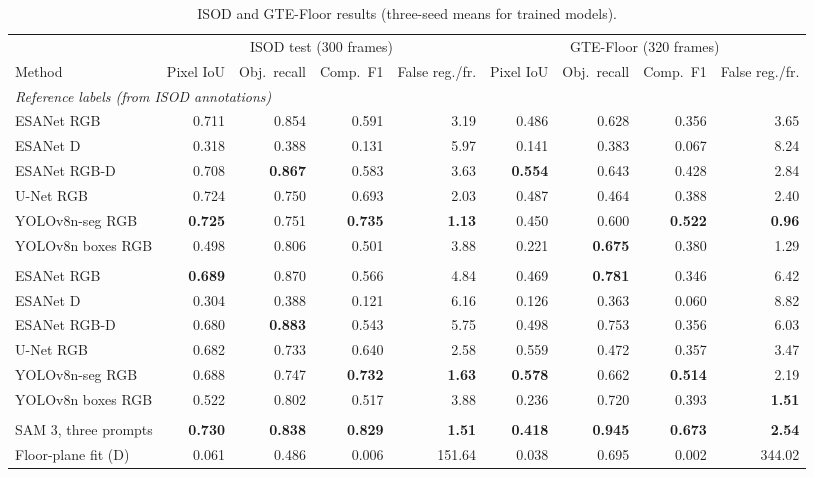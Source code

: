 \begin{table}[!t]
\caption{ISOD and GTE-Floor results (three-seed means for trained models).}
\label{tab:main}
\centering\footnotesize
\setlength{\tabcolsep}{4.5pt}
\begin{tabular}{lrrrrrrrr}
\toprule
 & \multicolumn{4}{c}{ISOD test (300 frames)} & \multicolumn{4}{c}{GTE-Floor (320 frames)}\\
\cmidrule(lr){2-5}\cmidrule(lr){6-9}
Method & Pixel IoU & Obj.\ recall & Comp.\ F1 & False reg./fr. & Pixel IoU & Obj.\ recall & Comp.\ F1 & False reg./fr.\\
\midrule
\multicolumn{9}{l}{\emph{Reference labels (from ISOD annotations)}}\\
\quad ESANet RGB & 0.711 & 0.854 & 0.591 & 3.19 & 0.486 & 0.628 & 0.356 & 3.65\\
\quad ESANet D & 0.318 & 0.388 & 0.131 & 5.97 & 0.141 & 0.383 & 0.067 & 8.24\\
\quad ESANet RGB-D & 0.708 & \textbf{0.867} & 0.583 & 3.63 & \textbf{0.554} & 0.643 & 0.428 & 2.84\\
\quad U-Net RGB & 0.724 & 0.750 & 0.693 & 2.03 & 0.487 & 0.464 & 0.388 & 2.40\\
\quad YOLOv8n-seg RGB & \textbf{0.725} & 0.751 & \textbf{0.735} & \textbf{1.13} & 0.450 & 0.600 & \textbf{0.522} & \textbf{0.96}\\
\quad YOLOv8n boxes RGB & 0.498 & 0.806 & 0.501 & 3.88 & 0.221 & \textbf{0.675} & 0.380 & 1.29\\
\addlinespace[2pt]
\multicolumn{9}{l}{\emph{Automatic SAM 3 labels}}\\
\quad ESANet RGB & \textbf{0.689} & 0.870 & 0.566 & 4.84 & 0.469 & \textbf{0.781} & 0.346 & 6.42\\
\quad ESANet D & 0.304 & 0.388 & 0.121 & 6.16 & 0.126 & 0.363 & 0.060 & 8.82\\
\quad ESANet RGB-D & 0.680 & \textbf{0.883} & 0.543 & 5.75 & 0.498 & 0.753 & 0.356 & 6.03\\
\quad U-Net RGB & 0.682 & 0.733 & 0.640 & 2.58 & 0.559 & 0.472 & 0.357 & 3.47\\
\quad YOLOv8n-seg RGB & 0.688 & 0.747 & \textbf{0.732} & \textbf{1.63} & \textbf{0.578} & 0.662 & \textbf{0.514} & 2.19\\
\quad YOLOv8n boxes RGB & 0.522 & 0.802 & 0.517 & 3.88 & 0.236 & 0.720 & 0.393 & \textbf{1.51}\\
\addlinespace[2pt]
\multicolumn{9}{l}{\emph{Direct methods}}\\
\quad SAM 3, three prompts & \textbf{0.730} & \textbf{0.838} & \textbf{0.829} & \textbf{1.51} & \textbf{0.418} & \textbf{0.945} & \textbf{0.673} & \textbf{2.54}\\
\quad Floor-plane fit (D) & 0.061 & 0.486 & 0.006 & 151.64 & 0.038 & 0.695 & 0.002 & 344.02\\
\bottomrule
\end{tabular}
\par{}
\end{table}
